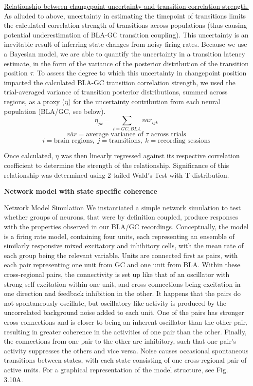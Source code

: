 \begin{refsection}
\noindent\underline{Relationship between changepoint uncertainty and transition correlation strength.} As alluded to above, uncertainty in estimating the timepoint of transitions limits the calculated correlation strength of transitions across populations (thus causing potential underestimation of BLA-GC transition coupling). This uncertainty is an inevitable result of inferring state changes from noisy firing rates. Because we use a Bayesian model, we are able to quantify the uncertainty in a transition latency estimate, in the form of the variance of the posterior distribution of the transition position $\tau$. To assess the degree to which this uncertainty in changepoint position impacted the calculated BLA-GC transition correlation strength, we used the trial-averaged variance of transition posterior distributions, summed across regions, as a proxy ($\eta$) for the uncertainty contribution from each neural population (BLA/GC, see below).
$$\eta_{jk}=\sum_{i=GC,BLA}\overline{var}_{ijk}$$
$$\overline{var}=\textrm{average variance of } \tau \textrm{ across trials}$$
$$i = \textrm{brain regions},\ j = \textrm{transitions}, \ k=\textrm{recording sessions}$$
 
Once calculated, $\eta$ was then linearly regressed against its respective correlation coefficient to determine the strength of the relationship. Significance of this relationship was determined using 2-tailed Wald’s Test with T-distribution.

\smallskip
\noindent\textbf{Network model with state specific coherence}\par
\noindent\underline{Network Model Simulation} We instantiated a simple network simulation to test whether groups of neurons, that were by definition coupled, produce responses with the properties observed in our BLA/GC recordings. Conceptually, the model is a firing rate model, containing four units, each representing an ensemble of similarly responsive mixed excitatory and inhibitory cells, with the mean rate of each group being the relevant variable. Units are connected first as pairs, with each pair representing one unit from GC and one unit from BLA. Within these cross-regional pairs, the connectivity is set up like that of an oscillator with strong self-excitation within one unit, and cross-connections being excitation in one direction and feedback inhibition in the other. It happens that the pairs do not spontaneously oscillate, but oscillatory-like activity is produced by the uncorrelated background noise added to each unit. One of the pairs has stronger cross-connections and is closer to being an inherent oscillator than the other pair, resulting in greater coherence in the activities of one pair than the other. Finally, the connections from one pair to the other are inhibitory, such that one pair’s activity suppresses the others and vice versa. Noise causes occasional spontaneous transitions between states, with each state consisting of one cross-regional pair of active units.  For a graphical representation of the model structure, see Fig. 3.10A.


\end{refsection}
